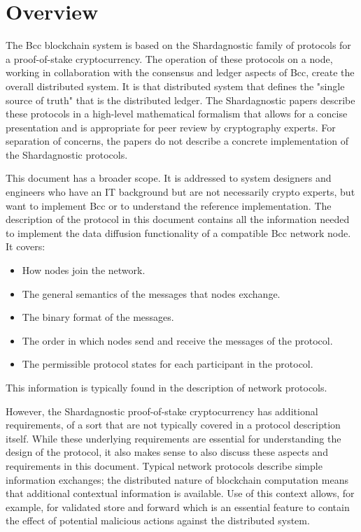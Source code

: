 \chapter{Overview}
The Bcc blockchain system is based on the Shardagnostic family of protocols
for a proof-of-stake cryptocurrency.
The operation of these protocols on a node, working in collaboration with the consensus
and ledger aspects of Bcc, create the overall distributed system.
It is that distributed system that defines the "single source of truth" that is the distributed ledger.
The Shardagnostic papers describe these protocols in a high-level mathematical formalism
that allows for a concise presentation and is appropriate for peer review by cryptography experts.
For separation of concerns, the papers do not describe a concrete implementation of the Shardagnostic
protocols.

This document has a broader scope.
It is addressed to system designers and engineers who have an IT background
but are not necessarily crypto experts,
but want to implement Bcc or to understand the reference implementation.
The description of the protocol in this document contains all the information needed to
implement the data diffusion functionality of a compatible Bcc network node.
It covers:
\begin{itemize}
\item How nodes join the network.
\item The general semantics of the messages that nodes exchange.
\item The binary format of the messages.
\item The order in which nodes send and receive the messages of the protocol.
\item The permissible protocol states for each participant in the protocol.
\end{itemize}
This information is typically found in the description of network protocols.

However, the Shardagnostic proof-of-stake cryptocurrency has additional requirements,
of a sort that are not typically covered in a
protocol  description itself.
While these underlying requirements are essential for understanding the design of the protocol,
it also makes sense to also discuss these aspects and requirements in this document.
Typical network protocols describe simple information exchanges;
the distributed nature of blockchain computation means
that additional contextual information is available.
Use of this context allows, for example, for validated store and forward
which is an essential feature to contain the effect of potential malicious actions
against the distributed system.

